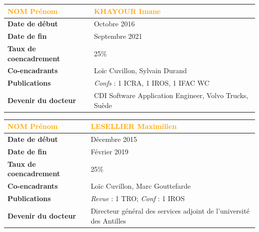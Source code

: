 \documentclass[a4paper,12pt]{article}
\newcommand{\separation}{\noindent{\color{black!40}\rule{\textwidth}{1pt}}}
\begin{document}
\newrefsection
\nocite{2-CAYD23,2-YCAD23,4-ADYC22,2-YACD21,4-YAOC21,4-YACD21,4-YACD21a,4-KCBY20,4-YGCD20,soft_teensyshot}
\printbibliography[title={\small Publications du doctorant}]

\separation{}

\newpage
%
%
\begin{table}[htbp]
\label{tab:Imane}
\centering
\begin{tabular}{>{\bfseries}ll}
\toprule %
\textup{\textcolor{orange}{NOM Prénom}} & \large{\textcolor{orange}{KHAYOUR Imane}}\\
\midrule
Date de début               & Octobre 2016\\
Date de fin                 & Septembre 2021\\
Taux de coencadrement       & 25\%\\
Co-encadrants               & Loïc Cuvillon, Sylvain Durand\\
Publications                & \emph{Confs} : 1 ICRA, 1 IROS, 1 IFAC WC \\
Devenir du docteur          & CDI Software Application Engineer, Volvo Trucks, Suède\\
\bottomrule
\end{tabular}
\end{table}

\newrefsection
\nocite{4-KCBY20,4-KDCG20,4-SKCD19}
\printbibliography[title={\small Publications du doctorant}]

\separation{}

\newpage
%
%
\begin{table}[htbp]
\label{tab:Maximilien}
\centering
\begin{tabular}{>{\bfseries}ll}
\toprule %
\textup{\textcolor{orange}{NOM Prénom}} & \large{\textcolor{orange}{LESELLIER Maximilien}}\\
\midrule
Date de début               & Décembre 2015\\
Date de fin                 & Février 2019\\
Taux de coencadrement       & 25\%\\
Co-encadrants               & Loïc Cuvillon, Marc Gouttefarde\\
Publications                & \emph{Revue} : 1 TRO; \emph{Conf} : 1 IROS \\
Devenir du docteur          & Directeur général des services adjoint de l'université des Antilles\\
\bottomrule
\end{tabular}
\end{table}
\end{document}
